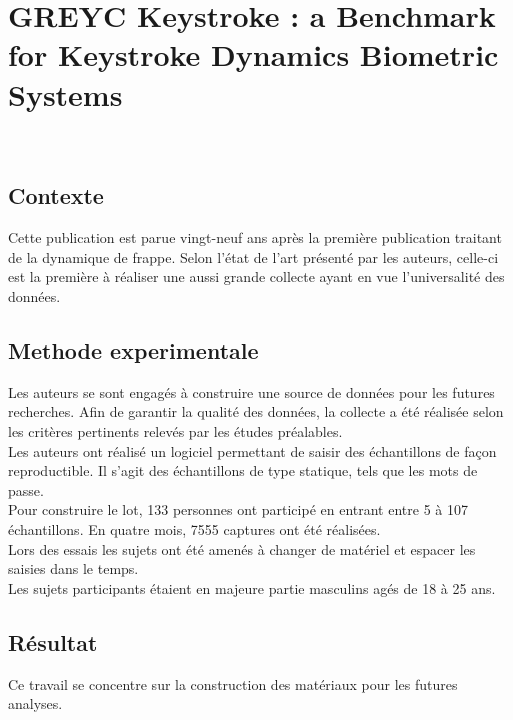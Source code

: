\section{GREYC Keystroke : a Benchmark for Keystroke Dynamics Biometric Systems\cite{giotGREYC}}

\\

\subsection{Contexte}

Cette publication est parue vingt-neuf ans après la première publication traitant de la dynamique de frappe. Selon l'état de l'art présenté par les auteurs, celle-ci est la première à réaliser une aussi grande collecte ayant en vue l'universalité des données.

\subsection{Methode experimentale}

Les auteurs se sont engagés à construire une source de données pour les futures recherches. Afin de garantir la qualité des données, la collecte a été réalisée selon les critères pertinents relevés par les études préalables.\\

Les auteurs ont réalisé un logiciel permettant de saisir des échantillons de façon reproductible. Il s'agit des échantillons de type statique, tels que les mots de passe.\\

Pour construire le lot, 133 personnes ont participé en entrant entre 5 à 107 échantillons. En quatre mois, 7555 captures ont été réalisées.\\

Lors des essais les sujets ont été amenés à changer de matériel et espacer les saisies dans le temps.\\

Les sujets participants étaient en majeure partie masculins agés de 18 à 25 ans.

\subsection{Résultat}

Ce travail se concentre sur la construction des matériaux pour les futures analyses.\\

